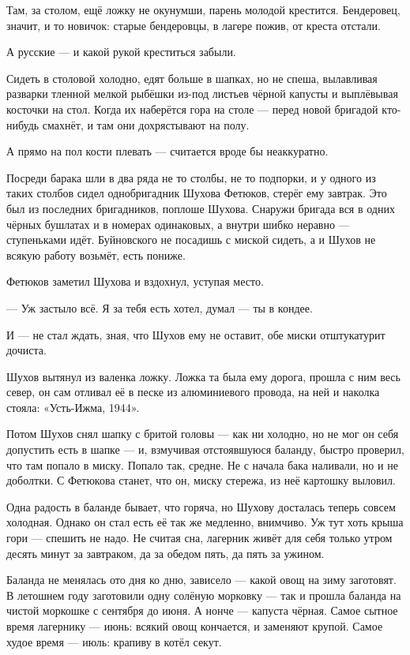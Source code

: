 Там, за столом, ещё ложку не окунумши, парень молодой крестится. Бендеровец, значит, и то 
новичок: старые бендеровцы, в лагере пожив, от креста отстали.

А русские --- и какой рукой креститься забыли.

Сидеть в столовой холодно, едят больше в шапках, но не спеша, вылавливая разварки тленной 
мелкой рыбёшки из-под листьев чёрной капусты и выплёвывая косточки на стол. Когда их 
наберётся гора на столе --- перед новой бригадой кто-нибудь смахнёт, и там они дохрястывают на 
полу.

А прямо на пол кости плевать --- считается вроде бы неаккуратно.

Посреди барака шли в два ряда не то столбы, не то подпорки, и у одного из таких столбов сидел 
однобригадник Шухова Фетюков, стерёг ему завтрак. Это был из последних бригадников, поплоше 
Шухова. Снаружи бригада вся в одних чёрных бушлатах и в номерах одинаковых, а внутри шибко 
неравно --- ступеньками идёт. Буйновского не посадишь с миской сидеть, а и Шухов не всякую 
работу возьмёт, есть пониже.

Фетюков заметил Шухова и вздохнул, уступая место.

--- Уж застыло всё. Я за тебя есть хотел, думал --- ты в кондее.

И --- не стал ждать, зная, что Шухов ему не оставит, обе миски отштукатурит дочиста.

Шухов вытянул из валенка ложку. Ложка та была ему дорога, прошла с ним весь север, он сам 
отливал её в песке из алюминиевого провода, на ней и наколка стояла: «Усть-Ижма, 1944».

Потом Шухов снял шапку с бритой головы --- как ни холодно, но не мог он себя допустить есть в 
шапке --- и, взмучивая отстоявшуюся баланду, быстро проверил, что там попало в миску. Попало 
так, средне. Не с начала бака наливали, но и не доболтки. С Фетюкова станет, что он, миску 
стережа, из неё картошку выловил.

Одна радость в баланде бывает, что горяча, но Шухову досталась теперь совсем холодная. 
Однако он стал есть её так же медленно, внимчиво. Уж тут хоть крыша гори --- спешить не надо. Не 
считая сна, лагерник живёт для себя только утром десять минут за завтраком, да за обедом 
пять, да пять за ужином.

Баланда не менялась ото дня ко дню, зависело --- какой овощ на зиму заготовят. В летошнем году 
заготовили одну солёную морковку --- так и прошла баланда на чистой моркошке с сентября до 
июня. А нонче --- капуста чёрная. Самое сытное время лагернику --- июнь: всякий овощ кончается, и 
заменяют крупой. Самое худое время --- июль: крапиву в котёл секут.


